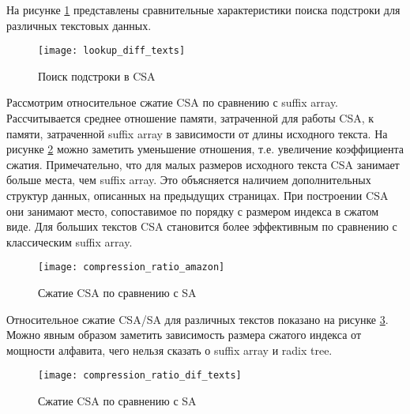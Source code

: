На рисунке \ref{fig:CSA_Lookup_diff_texts} представлены сравнительные характеристики поиска
подстроки для различных текстовых данных.

\begin{figure}[h!]
    \centering
    \texttt{[image: lookup\_diff\_texts]}
    \caption{Поиск подстроки в CSA}
    \label{fig:CSA_Lookup_diff_texts}
\end{figure}

Рассмотрим относительное сжатие CSA по сравнению с suffix array. Рассчитывается среднее отношение памяти,
затраченной для работы CSA, к памяти, затраченной suffix array в зависимости от длины исходного текста.
На рисунке \ref{fig:CSA_compression_ratio_amazon} можно заметить уменьшение отношения, т.е. увеличение
коэффициента сжатия. Примечательно, что для малых размеров исходного текста CSA занимает больше места,
чем suffix array. Это объясняется наличием дополнительных структур данных, описанных на предыдущих страницах.
При построении CSA они занимают место, сопоставимое по порядку с размером индекса в сжатом виде.
Для больших текстов CSA становится более эффективным по сравнению с классическим suffix array.

\begin{figure}[h!]
    \centering
    \texttt{[image: compression\_ratio\_amazon]}
    \caption{Сжатие CSA по сравнению с SA}
    \label{fig:CSA_compression_ratio_amazon}
\end{figure}

\clearpage
Относительное сжатие CSA/SA для различных текстов показано на рисунке \ref{fig:CSA_compression_ratio_dif_texts}.
Можно явным образом заметить зависимость размера сжатого индекса от мощности алфавита, чего нельзя
сказать о suffix array и radix tree.

\begin{figure}[h!]
    \centering
    \texttt{[image: compression\_ratio\_dif\_texts]}
    \caption{Сжатие CSA по сравнению с SA}
    \label{fig:CSA_compression_ratio_dif_texts}
\end{figure}